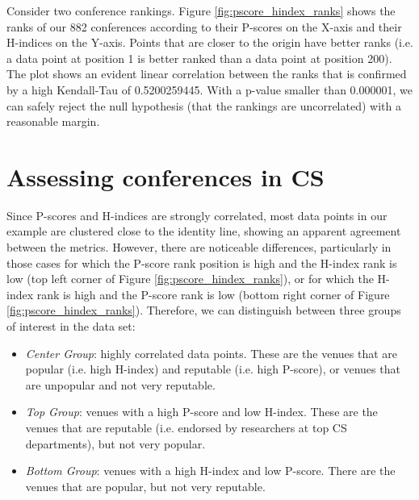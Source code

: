 \documentclass[man]{apa6}
\begin{document}
Consider two conference rankings. Figure \ref{fig:pscore_hindex_ranks} shows the ranks of our 882 conferences according to
their P-scores
on the X-axis and their H-indices on the Y-axis. Points that are closer to the origin have better ranks (i.e. a data point at position 1 is better ranked than a data point at position 200).
The plot shows an evident linear correlation between the ranks that is confirmed
by a high Kendall-Tau of 0.5200259445. With a p-value smaller than 0.000001, we can safely reject the null 
hypothesis (that the rankings are uncorrelated) with a reasonable margin.

\section{Assessing conferences in CS}
\label{sec:notifications}

Since P-scores and H-indices are strongly correlated, most data points in our example are clustered close to the identity 
line, showing an apparent agreement between the metrics. However, there are noticeable differences, 
particularly in those cases for which the P-score rank position is high and the H-index rank is low 
(top left corner of Figure \ref{fig:pscore_hindex_ranks}), or for which the H-index rank is high and the 
P-score rank is low (bottom right corner of Figure \ref{fig:pscore_hindex_ranks}). Therefore, we 
can distinguish between three groups of interest in the data set:

\begin{itemize}
\item \textit{Center Group}: highly correlated data points. These are the venues that are popular (i.e. high H-index) and reputable (i.e. high P-score), or venues that are unpopular and not very reputable.
\item \textit{Top Group}: venues with a high P-score and low H-index. These are the venues that are reputable (i.e. endorsed by researchers at top CS departments), but not very popular.
\item \textit{Bottom Group}: venues with a high H-index and low P-score. There are the venues that are popular, but not very reputable.

\end{itemize}
\end{document}
